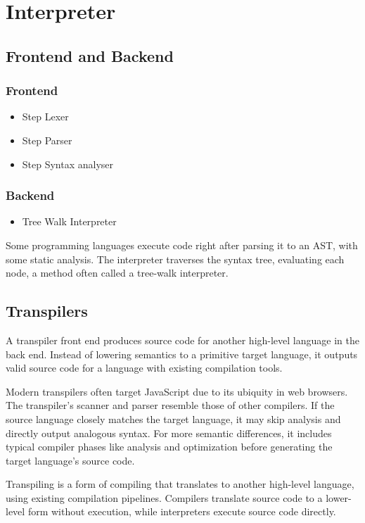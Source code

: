 \section{Interpreter}
\label{sec:interpreter}

\subsection{Frontend and Backend}
\label{sec:frontend_backend}

\subsubsection{Frontend}
\begin{itemize}
    \item Step Lexer
    \item Step Parser
    \item Step Syntax analyser
\end{itemize}

\subsubsection{Backend}
\begin{itemize}
    \item Tree Walk Interpreter
\end{itemize}

Some programming languages execute code right after parsing it to an AST, with some static analysis. The interpreter traverses the syntax tree, evaluating each node, a method often called a tree-walk interpreter.

\subsection{Transpilers}
\label{sec:transpilers}

A transpiler front end produces source code for another high-level language in the back end. Instead of lowering semantics to a primitive target language, it outputs valid source code for a language with existing compilation tools.

Modern transpilers often target JavaScript due to its ubiquity in web browsers. The transpiler's scanner and parser resemble those of other compilers. If the source language closely matches the target language, it may skip analysis and directly output analogous syntax. For more semantic differences, it includes typical compiler phases like analysis and optimization before generating the target language's source code.

Transpiling is a form of compiling that translates to another high-level language, using existing compilation pipelines. Compilers translate source code to a lower-level form without execution, while interpreters execute source code directly.
